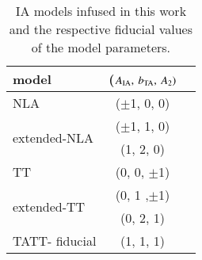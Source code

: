 \begin{table}
   \centering
    \caption{IA models infused in this work and the respective fiducial values of the model parameters.}
   \begin{tabular}{@{} lcr @{}} %
      \hline
      \hline
      model   		& ($A_{\rm IA}, \: b_{\rm TA}, \: A_2)$ \\
      \hline
      NLA     		& {($\pm$1, 0, 0) }&  \\
      \multirow{2}{*}{extended-NLA }  	&   {($\pm$1, 1, 0)}   \\
      							&  {(1, 2, 0)}   \\
      TT 			&  {(0, 0, $\pm$1)} &  \\
      \multirow{2}{*}{extended-TT} 	&  {(0, 1 ,$\pm$1)}   \\
      				&  {(0, 2, 1)}   \\
      TATT- fiducial	&  { (1, 1, 1)}  \\
      \hline
      \hline

   \end{tabular}
   \label{table:IAmodels}
\end{table}